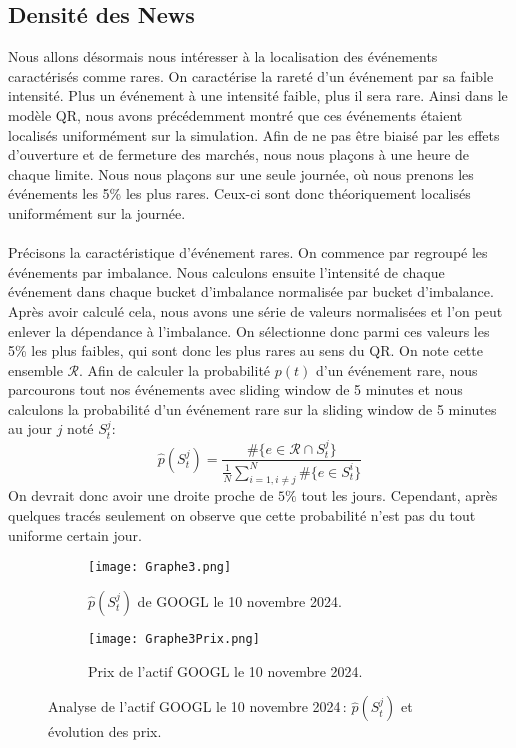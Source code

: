 \documentclass[12pt,a4paper]{article}
\theoremstyle{definition}
\theoremstyle{remark}
\begin{document}
\subsection{Densité des News}
Nous allons désormais nous intéresser à la localisation des événements caractérisés comme rares. On caractérise la rareté d'un événement par sa faible intensité. Plus un événement à une intensité faible, plus il sera rare. Ainsi dans le modèle QR, nous avons précédemment montré que ces événements étaient localisés uniformément sur la simulation. Afin de ne pas être biaisé par les effets d'ouverture et de fermeture des marchés, nous nous plaçons à une heure de chaque limite. Nous nous plaçons sur une seule journée, où nous prenons les événements les 5\% les plus rares. Ceux-ci sont donc théoriquement localisés uniformément sur la journée.
\\
\\
Précisons la caractéristique d'événement rares. On commence par regroupé les événements par imbalance. Nous calculons ensuite l'intensité de chaque événement dans chaque bucket d'imbalance normalisée par bucket d'imbalance. Après avoir calculé cela, 
nous avons une série de valeurs normalisées et l'on peut enlever la dépendance à l'imbalance. On sélectionne donc parmi ces valeurs les 5\% les plus faibles, qui sont donc les plus rares au sens du QR. On note cette ensemble $\mathcal{R}$. Afin de calculer la probabilité $p(t)$ d'un événement rare, nous parcourons tout nos événements avec sliding window de 5 minutes et nous calculons la probabilité d'un événement rare sur la sliding window de 5 minutes au jour $j$ noté $S_t^j$:
$$\hat{p}(S_t^j) = \frac{\#\{e\in \mathcal{R}\cap S_t^j\}}{\frac{1}{N}\sum_{i=1,i\neq j}^N\#\{e\in S_t^i\}}$$
On devrait donc avoir une droite proche de $5\%$ tout les jours. Cependant, après quelques tracés seulement on observe que cette probabilité n'est pas du tout uniforme certain jour.
\begin{figure}[h!]
    \centering
    \begin{subfigure}[b]{0.48\textwidth}
        \centering
        \texttt{[image: Graphe3.png]}
        \caption{$\hat{p}(S_t^j)$ de GOOGL le 10 novembre 2024.}
        \label{fig:graphe3}
    \end{subfigure}
    \hfill
    \begin{subfigure}[b]{0.48\textwidth}
        \centering
        \texttt{[image: Graphe3Prix.png]}
        \caption{Prix de l'actif GOOGL le 10 novembre 2024.}
        \label{fig:graphe3Prix}
    \end{subfigure}

    \caption{Analyse de l'actif GOOGL le 10 novembre 2024 : $\hat{p}(S_t^j)$ et évolution des prix.}
    \label{fig:comparison}
\end{figure}
\end{document}
